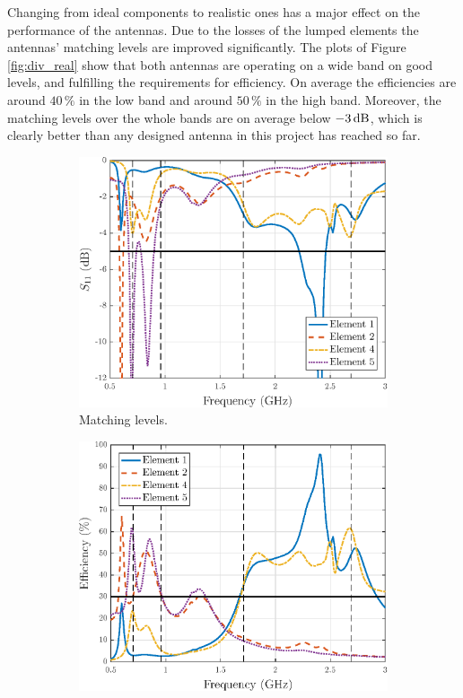 Changing from ideal components to realistic ones has a major effect on the performance of the antennas. Due to the losses of the lumped elements the antennas' matching levels are improved significantly. The plots of Figure \ref{fig:div_real} show that both antennas are operating on a wide band on good levels, and fulfilling the requirements for efficiency. On average the efficiencies are around $40\,\%$ in the low band and around $50\,\%$ in the high band. Moreover, the matching levels over the whole bands are on average below $-3\,\mathrm{dB}$, which is clearly better than any designed antenna in this project has reached so far.

\begin{figure}[H]
    \centering
    \begin{subfigure}[b]{0.49\textwidth}
        \includegraphics[width=\textwidth]{img/diversity_final_real_match.eps}
        \caption{Matching levels.}
        \label{fig:div_match_real}
    \end{subfigure}
    \begin{subfigure}[b]{0.49\textwidth}
        \includegraphics[width=\textwidth]{img/diversity_eff_real.eps}

\end{subfigure}
\end{figure}
